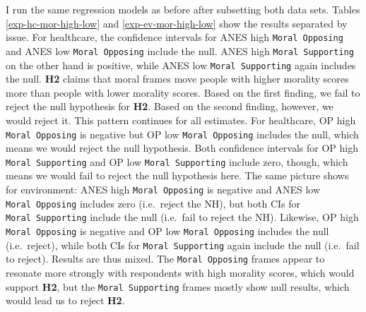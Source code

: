 \documentclass[12pt,econ]{sources/authesis}
\begin{document}
I run the same regression models as before after subsetting both data sets. Tables \ref{exp-hc-mor-high-low} and \ref{exp-ev-mor-high-low} show the results separated by issue. For healthcare, the confidence intervals for ANES high \texttt{Moral\ Opposing} and ANES low \texttt{Moral\ Opposing} include the null. ANES high \texttt{Moral\ Supporting} on the other hand is positive, while ANES low \texttt{Moral\ Supporting} again includes the null. \textbf{H2} claims that moral frames move people with higher morality scores more than people with lower morality scores. Based on the first finding, we fail to reject the null hypothesis for \textbf{H2}. Based on the second finding, however, we would reject it. This pattern continues for all estimates. For healthcare, OP high \texttt{Moral\ Opposing} is negative but OP low \texttt{Moral\ Opposing} includes the null, which means we would reject the null hypothesis. Both confidence intervals for OP high \texttt{Moral\ Supporting} and OP low \texttt{Moral\ Supporting} include zero, though, which means we would fail to reject the null hypothesis here. The same picture shows for environment: ANES high \texttt{Moral\ Opposing} is negative and ANES low \texttt{Moral\ Opposing} includes zero (i.e.~reject the NH), but both CIs for \texttt{Moral\ Supporting} include the null (i.e.~fail to reject the NH). Likewise, OP high \texttt{Moral\ Opposing} is negative and OP low \texttt{Moral\ Opposing} includes the null (i.e.~reject), while both CIs for \texttt{Moral\ Supporting} again include the null (i.e.~fail to reject). Results are thus mixed. The \texttt{Moral\ Opposing} frames appear to resonate more strongly with respondents with high morality scores, which would support \textbf{H2}, but the \texttt{Moral\ Supporting} frames mostly show null results, which would lead us to reject \textbf{H2}.

\ssp

\footnotesize
\end{document}
